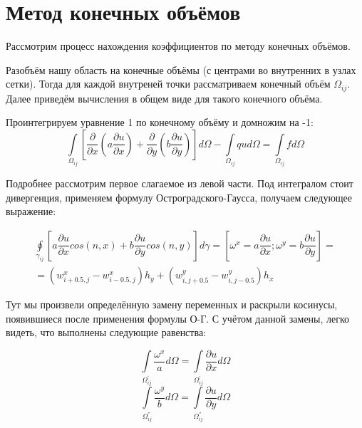 \documentclass[12pt]{article}
\begin{document}
\section{Метод конечных объёмов}

Рассмотрим  процесс нахождения коэффициентов по методу конечных объёмов.

Разобъём нашу область на конечные объёмы (с центрами во внутренних в узлах сетки). Тогда для каждой внутреней точки рассматриваем конечный объём $\Omega_{ij}$. Далее приведём вычисления в общем виде для такого конечного объёма.

Проинтегрируем уравнение 1 по конечному объёму и домножим на -1:
\begin{equation}
\int\limits_{\Omega_{ij}}{\left[ \dfrac{\partial}{\partial x}\left( a\dfrac{\partial u}{\partial x}\right) + \dfrac{\partial}{\partial y}\left( b\dfrac{\partial u}{\partial y}\right) \right]d\Omega}
 - \int\limits_{\Omega_{ij}}qud\Omega = \int\limits_{\Omega_{ij}}fd\Omega 
\end{equation}

Подробнее рассмотрим первое слагаемое из левой части. Под интегралом стоит дивергенция, применяем формулу Остроградского-Гаусса, получаем следующее выражение:

\begin{eqnarray}
\oint\limits_{\gamma_{ij}}{\left[ a\dfrac{\partial u}{\partial x}cos(n,x) + b\dfrac{\partial u}{\partial y}cos(n,y) \right]d\gamma} = \left[ \omega^x = a\dfrac{\partial u}{\partial x}; \omega^y =  b\dfrac{\partial u}{\partial y} \right] = 
\\
 = \left( w_{i+0.5,j}^x - w_{i-0.5,j}^x \right) h_y + 
\left( w_{i,j+0.5}^y - w_{i,j-0.5}^y \right) h_x 
\end{eqnarray}

Тут мы произвели определённую замену переменных и раскрыли косинусы, появившиеся после применения формулы О-Г. С учётом данной замены, легко видеть, что выполнены следующие равенства:

\begin{equation}\label{eq1}
\int\limits_{\Omega_{ij}^{'}}{\dfrac{\omega^x}{a}d\Omega} = \int\limits_{\Omega_{ij}^{'}}{\dfrac{\partial u}{\partial x}d\Omega} 
\end{equation}
\begin{equation}\label{eq2}
\int\limits_{\Omega_{ij}^{''}}{\dfrac{\omega^y}{b}d\Omega} = \int\limits_{\Omega_{ij}^{''}}{\dfrac{\partial u}{\partial y}d\Omega}
\end{equation}
\end{document}
